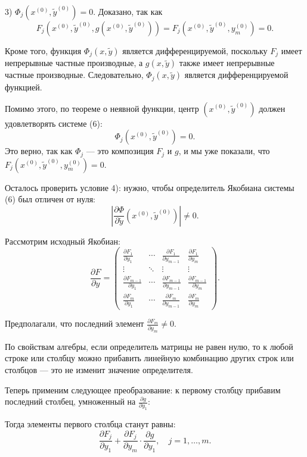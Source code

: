\documentclass{article}
\begin{document}
3) $\Phi_j(x^{(0)}, \widetilde{y}^{(0)}) = 0$. Доказано, так как
\[
F_j(x^{(0)}, \widetilde{y}^{(0)}, g(x^{(0)}, \widetilde{y}^{(0)})) = F_j(x^{(0)}, \widetilde{y}^{(0)}, y_m^{(0)}) = 0.
\]

Кроме того, функция $\Phi_j(x, \widetilde{y})$ является дифференцируемой, поскольку $F_j$ имеет непрерывные частные производные, а $g(x, \widetilde{y})$ также имеет непрерывные частные производные. Следовательно, $\Phi_j(x, \widetilde{y})$ является дифференцируемой функцией.

Помимо этого, по теореме о неявной функции, центр $(x^{(0)}, \widetilde{y}^{(0)})$ должен удовлетворять системе (6):
\[
\Phi_j(x^{(0)}, \widetilde{y}^{(0)}) = 0.
\]
Это верно, так как $\Phi_j$ — это композиция $F_j$ и $g$, и мы уже показали, что $F_j(x^{(0)}, \widetilde{y}^{(0)}, y_m^{(0)}) = 0$.

Осталось проверить условие 4): нужно, чтобы определитель Якобиана системы (6) был отличен от нуля:
\[
\left| \frac{\partial \Phi}{\partial \widetilde{y}}(x^{(0)}, \widetilde{y}^{(0)}) \right| \neq 0.
\]

Рассмотрим исходный Якобиан:
\[
\frac{\partial F}{\partial y} =
\begin{pmatrix}
\frac{\partial F_1}{\partial y_1} & \cdots & \frac{\partial F_1}{\partial y_{m-1}} & \frac{\partial F_1}{\partial y_m} \\
\vdots & \ddots & \vdots & \vdots \\
\frac{\partial F_{m-1}}{\partial y_1} & \cdots & \frac{\partial F_{m-1}}{\partial y_{m-1}} & \frac{\partial F_{m-1}}{\partial y_m} \\
\frac{\partial F_m}{\partial y_1} & \cdots & \frac{\partial F_m}{\partial y_{m-1}} & \frac{\partial F_m}{\partial y_m}
\end{pmatrix}.
\]

Предполагали, что последний элемент $\frac{\partial F_m}{\partial y_m} \neq 0$.

По свойствам алгебры, если определитель матрицы не равен нулю, то к любой строке или столбцу можно прибавить линейную комбинацию других строк или столбцов — это не изменит значение определителя.

Теперь применим следующее преобразование: к первому столбцу прибавим последний столбец, умноженный на $\frac{\partial g}{\partial y_1}$:

Тогда элементы первого столбца станут равны:
\[
\frac{\partial F_j}{\partial y_1} + \frac{\partial F_j}{\partial y_m} \cdot \frac{\partial g}{\partial y_1}, \quad j = 1, \dots, m.
\]
\end{document}
